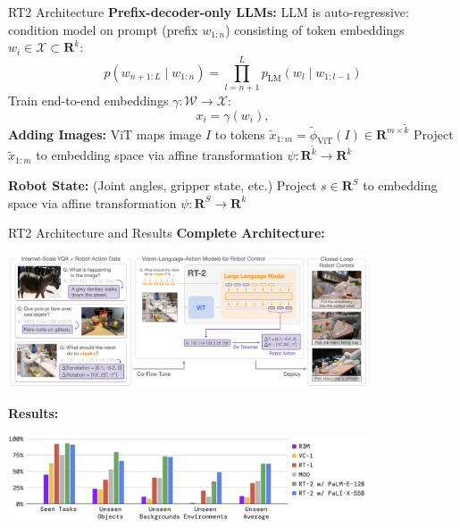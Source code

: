 \documentclass{beamer}
\begin{document}
\begin{frame}[t]{RT2 Architecture}
    \textbf{Prefix-decoder-only LLMs:} \newline
    LLM is auto-regressive: condition model on prompt (prefix $w_{1:n}$) consisting of token embeddings $w_i \in \mathcal{X} \subset \mathbf{R}^k$: \newline
    \[p(w_{n+1:L} \mid w_{1:n}) = \prod_{l=n+1}^{L} p_{\text{LM}}(w_l \mid w_{1:l-1})\]
    Train end-to-end embeddings $\gamma: \mathcal{W} \rightarrow \mathcal{X}$:
    \[x_i = \gamma(w_i),\]
    \textbf{Adding Images:} \newline
    ViT maps image $I$ to tokens $\tilde{x}_{1:m} = \tilde{\phi}_{\text{ViT}}(I) \in \mathbf{R}^{m \times \tilde{k}}$\newline
    Project $\tilde{x}_{1:m}$ to embedding space via affine transformation $\psi: \mathbf{R}^{\tilde{k}} \rightarrow \mathbf{R}^k$\newline

    \textbf{Robot State:} (Joint angles, gripper state, etc.) \newline
    Project $s \in \mathbf{R}^S$ to embedding space via affine transformation $\psi: \mathbf{R}^S \rightarrow \mathbf{R}^k$\newline
\end{frame}

\begin{frame}[t]{RT2 Architecture and Results}
    \textbf{Complete Architecture:}
    \begin{center}
        \includegraphics[width=0.8\textwidth]{./img/rt2.png}
    \end{center}
    \textbf{Results:}
    \begin{center}
        \includegraphics[width=0.8\textwidth]{./img/rt2_results.png}
    \end{center}
\end{frame}
\end{document}
